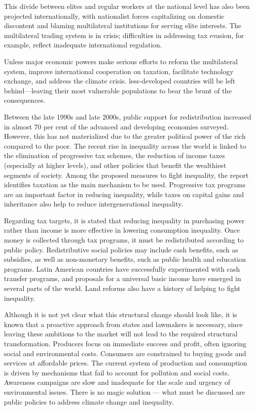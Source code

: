 This divide between elites and regular workers at the national level has also been projected internationally, with nationalist forces capitalizing on domestic discontent and blaming multilateral institutions for serving elite interests. The multilateral trading system is in crisis; difficulties in addressing tax evasion, for example, reflect inadequate international regulation.

Unless major economic powers make serious efforts to reform the multilateral system, improve international cooperation on taxation, facilitate technology exchange, and address the climate crisis. less-developed countries will be left behind—leaving their most vulnerable populations to bear the brunt of the consequences.

Between the late 1990s and late 2000s, public support for redistribution increased in almost 70 per cent of the advanced and developing economies surveyed. However, this has not materialized due to the greater political power of the rich compared to the poor. The recent rise in inequality across the world is linked to the elimination of progressive tax schemes, the reduction of income taxes (especially at higher levels), and other policies that benefit the wealthiest segments of society. Among the proposed measures to fight inequality, the report identifies taxation as the main mechanism to be used. Progressive tax programs are an important factor in reducing inequality, while taxes on capital gains and inheritance also help to reduce intergenerational inequality.

Regarding tax targets, it is stated that reducing inequality in purchasing power rather than income is more effective in lowering consumption inequality. Once money is collected through tax programs, it must be redistributed according to public policy. Redistributive social policies may include cash benefits, such as subsidies, as well as non-monetary benefits, such as public health and education programs. Latin American countries have successfully experimented with cash transfer programs, and proposals for a universal basic income have emerged in several parts of the world. Land reforms also have a history of helping to fight inequality.

Although it is not yet clear what this structural change should look like, it is known that a proactive approach from states and lawmakers is necessary, since leaving these ambitions to the market will not lead to the required structural transformation. Producers focus on immediate success and profit, often ignoring social and environmental costs. Consumers are constrained to buying goods and services at affordable prices. The current system of production and consumption is driven by mechanisms that fail to account for pollution and social costs. Awareness campaigns are slow and inadequate for the scale and urgency of environmental issues. There is no magic solution — what must be discussed are public policies to address climate change and inequality.


